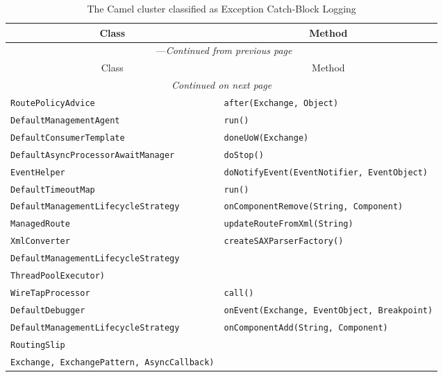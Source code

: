 \begin{center}
\begin{longtable}{ll}
\caption{The Camel cluster classified as Exception Catch-Block Logging}\\
\toprule\multicolumn{1}{c}{Class}&\multicolumn{1}{c}{Method}\\\midrule
\endfirsthead

\multicolumn{2}{c}{\tablename\ \thetable{}---\textit{Continued from previous page}} \\\midrule
\multicolumn{1}{c}{Class}&\multicolumn{1}{c}{Method}\\\midrule
\endhead
\multicolumn{2}{c}{\textit{Continued on next page}}\\\midrule
\endfoot
\bottomrule
\endlastfoot

\lstinline/RoutePolicyAdvice/&{\lstinline/after(Exchange, Object)/}\\
\lstinline/DefaultManagementAgent/&{\lstinline/run()/}\\
\lstinline/DefaultConsumerTemplate/&{\lstinline/doneUoW(Exchange)/}\\
\lstinline/DefaultAsyncProcessorAwaitManager/&{\lstinline/doStop()/}\\
\lstinline/EventHelper/&{\lstinline/doNotifyEvent(EventNotifier, EventObject)/}\\
\lstinline/DefaultTimeoutMap/&{\lstinline/run()/}\\
\lstinline/DefaultManagementLifecycleStrategy/&{\lstinline/onComponentRemove(String, Component)/}\\
\lstinline/ManagedRoute/&{\lstinline/updateRouteFromXml(String)/}\\
\lstinline/XmlConverter/&{\lstinline/createSAXParserFactory()/}\\
\lstinline/DefaultManagementLifecycleStrategy/&\raisebox{-13pt}{\shortstack{\lstinline/onThreadPoolRemove(CamelContext,/\\\lstinline/ThreadPoolExecutor)/}}\\
\lstinline/WireTapProcessor/&{\lstinline/call()/}\\
\lstinline/DefaultDebugger/&{\lstinline/onEvent(Exchange, EventObject, Breakpoint)/}\\
\lstinline/DefaultManagementLifecycleStrategy/&{\lstinline/onComponentAdd(String, Component)/}\\
\lstinline/RoutingSlip/&\raisebox{-13pt}{\shortstack{\lstinline/doInAsyncProducer(Producer, AsyncProcessor,/\\\lstinline/Exchange, ExchangePattern, AsyncCallback)/}}\\

\end{longtable}
\end{center}
